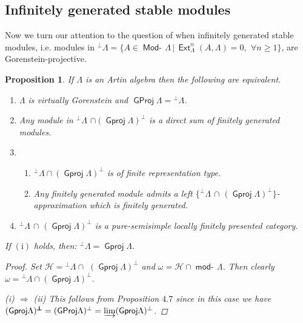\documentclass[oneside, a4paper,reqno]{amsart}
\numberwithin{equation}{section}
\newtheorem{prop}[thm]{Proposition}
\theoremstyle{definition}
\begin{document}
\subsection{Infinitely generated stable modules} Now we turn our attention to the question of when
infinitely generated stable modules, i.e. modules in
${^{\pmb{\bot}}}\Lambda = \{A \in \operatorname*{\mathsf{Mod}-\!}\Lambda \, | \,
\operatorname*{\mathsf{Ext}}^{n}_{\Lambda}(A,\Lambda) = 0, \,\ \forall n \geq 1 \}$, are
Gorenstein-projective.

\begin{prop} If $\Lambda$ is an Artin algebra then the following are equivalent.
\begin{enumerate}
\item $\Lambda$ is virtually Gorenstein and ${\operatorname{\mathsf{GProj}}\nolimits}\Lambda =
{^{\pmb{\bot}}}\Lambda$.
\item Any module in ${^{\pmb{\bot}}}\Lambda$ $\cap
({\operatorname{\mathsf{Gproj}}\nolimits}\Lambda)^{\pmb\bot} $ is a direct sum of finitely generated
modules.
\item
\begin{enumerate}
\item ${^{\bot}}\Lambda \cap ({\operatorname{\mathsf{Gproj}}\nolimits}\Lambda)^{\bot}$ is of finite
representation type.
\item Any finitely generated module admits a left
$\{ {^{\pmb{\bot}}}\Lambda$ $\cap$
$({\operatorname{\mathsf{Gproj}}\nolimits}\Lambda)^{\pmb\bot}\}$-approximation which is finitely
generated.
\end{enumerate}
\item ${^{\pmb{\bot}}}\Lambda$ $\cap$
$({\operatorname{\mathsf{Gproj}}\nolimits}\Lambda)^{\pmb{\bot}}$ is a pure-semisimple locally finitely
presented category.
\end{enumerate}
If $\mathrm{(i)}$ holds, then: ${^{\bot}}\Lambda = {\operatorname{\mathsf{Gproj}}\nolimits}\Lambda$.
\begin{proof}  Set $\mathcal H = {^{\pmb{\bot}}}\Lambda
\cap$ $({\operatorname{\mathsf{Gproj}}\nolimits}\Lambda)^{\pmb\bot}$ and $\omega = \mathcal H \cap
\operatorname*{\mathsf{mod}-\!}\Lambda$. Then clearly $\omega = {^{\bot}}\Lambda \cap
({\operatorname{\mathsf{Gproj}}\nolimits}\Lambda)^{\bot}$.

(i) $\Rightarrow$ (ii) This follows from Proposition $4.7$ since in this
case we have $({\operatorname{\mathsf{Gproj}}\nolimits}\Lambda)^{\pmb{\bot}} = ({\operatorname{\mathsf{GProj}}\nolimits}\Lambda)^{\bot} =
\operatorname*{\varinjlim}({\operatorname{\mathsf{Gproj}}\nolimits}\Lambda)^{\bot}$.


\end{proof}
\end{prop}
\end{document}
